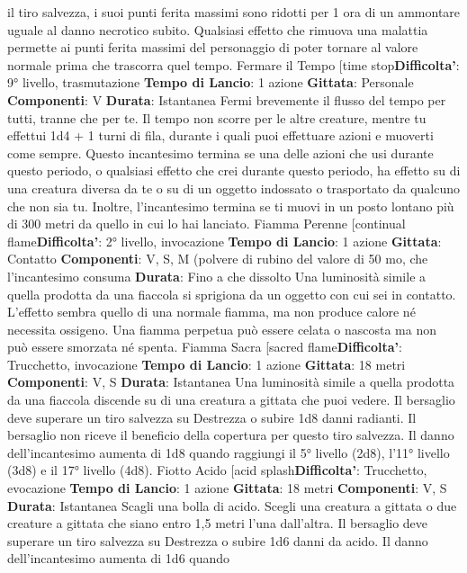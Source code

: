 \begin{multicols}{2}
il tiro salvezza, i suoi punti ferita massimi sono ridotti
per 1 ora di un ammontare uguale al danno necrotico
subito. Qualsiasi effetto che rimuova una malattia
permette ai punti ferita massimi del personaggio di
poter tornare al valore normale prima che trascorra quel
tempo.
Fermare il Tempo
[time stop\textbf{Difficolta'}:
9° livello, trasmutazione
\textbf{Tempo di Lancio}: 1 azione
\textbf{Gittata}: Personale
\textbf{Componenti}: V
\textbf{Durata}: Istantanea
Fermi brevemente il flusso del tempo per tutti, tranne
che per te. Il tempo non scorre per le altre creature, 
mentre tu effettui 1d4 + 1 turni di fila, durante i quali
puoi effettuare azioni e muoverti come sempre.
Questo incantesimo termina se una delle azioni che usi
durante questo periodo, o qualsiasi effetto che crei
durante questo periodo, ha effetto su di una creatura
diversa da te o su di un oggetto indossato o trasportato
da qualcuno che non sia tu. Inoltre, l’incantesimo
termina se ti muovi in un posto lontano più di 300 metri
da quello in cui lo hai lanciato.
Fiamma Perenne
[continual flame\textbf{Difficolta'}:
2° livello, invocazione
\textbf{Tempo di Lancio}: 1 azione
\textbf{Gittata}: Contatto
\textbf{Componenti}: V, S, M (polvere di rubino del valore di 50
mo, che l’incantesimo consuma
\textbf{Durata}: Fino a che dissolto
Una luminosità simile a quella prodotta da una fiaccola
si sprigiona da un oggetto con cui sei in contatto.
L’effetto sembra quello di una normale fiamma, ma non
produce calore né necessita ossigeno. Una fiamma
perpetua può essere celata o nascosta ma non può
essere smorzata né spenta.
Fiamma Sacra
[sacred flame\textbf{Difficolta'}:
Trucchetto, invocazione
\textbf{Tempo di Lancio}: 1 azione
\textbf{Gittata}: 18 metri
\textbf{Componenti}: V, S
\textbf{Durata}: Istantanea
Una luminosità simile a quella prodotta da una fiaccola
discende su di una creatura a gittata che puoi vedere. Il
bersaglio deve superare un tiro salvezza su Destrezza
o subire 1d8 danni radianti. Il bersaglio non riceve il
beneficio della copertura per questo tiro salvezza.
Il danno dell’incantesimo aumenta di 1d8 quando
raggiungi il 5° livello (2d8), l’11° livello (3d8) e il 17°
livello (4d8).
Fiotto Acido
[acid splash\textbf{Difficolta'}:
Trucchetto, evocazione
\textbf{Tempo di Lancio}: 1 azione
\textbf{Gittata}: 18 metri
\textbf{Componenti}: V, S
\textbf{Durata}: Istantanea
Scagli una bolla di acido. Scegli una creatura a gittata o
due creature a gittata che siano entro 1,5 metri l’una
dall’altra. Il bersaglio deve superare un tiro salvezza su
Destrezza o subire 1d6 danni da acido.
Il danno dell’incantesimo aumenta di 1d6 quando

\end{multicols}
